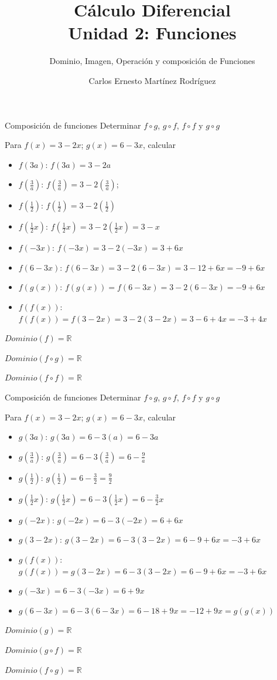 \documentclass[aspectratio=169,10pt]{beamer}
\title{Cálculo Diferencial\\Unidad 2: Funciones}
\subtitle{Dominio, Imagen, Operación y composición de Funciones}
\author{Carlos Ernesto Martínez Rodríguez}
\institute{Tecnológico Nacional de México}
\date{}
\begin{document}

\begin{frame}{Composición de funciones}
Determinar $f\circ g$, $g\circ f$, $f\circ f$ y $g\circ g$

Para $f(x)=3-2x$; $g(x)=6-3x$, calcular
\begin{itemize}
\item $f(3a)$: $f(3a)= 3-2a$
\item $f(\frac{3}{a})$: $f(\frac{3}{a})= 3-2(\frac{3}{a})$; 
\item $f(\frac{1}{2})$: $f(\frac{1}{2})= 3-2(\frac{1}{2})$
\item $f(\frac{1}{2}x)$: $f(\frac{1}{2}x)= 3-2(\frac{1}{2}x)=3-x$
\item $f(-3x)$: $f(-3x)= 3-2(-3x)=3+6x$
\item $f(6-3x)$: $f(6-3x)= 3-2(6-3x)=3-12+6x=-9+6x$
\item  $f(g(x))$: $f(g(x))= f(6-3x)=3-2(6-3x)= -9+6x$
\item  $f(f(x))$: $f(f(x))= f(3-2x)=3-2(3-2x)=3-6+4x=-3+4x$
\end{itemize}

$Dominio(f)=\mathbb{R}$

$Dominio(f\circ g)=\mathbb{R}$

$Dominio(f\circ f)=\mathbb{R}$
\end{frame}

\begin{frame}{Composición de funciones}
Determinar $f\circ g$, $g\circ f$, $f\circ f$ y $g\circ g$

Para $f(x)=3-2x$; $g(x)=6-3x$, calcular
\begin{itemize}
\item $g(3a)$: $g(3a)= 6-3(a)=6-3a$
\item $g(\frac{3}{a})$: $g(\frac{3}{a})= 6-3(\frac{3}{a})=6-\frac{9}{a}$
\item $g(\frac{1}{2})$: $g(\frac{1}{2})= 6-\frac{3}{2}=\frac{9}{2}$
\item $g(\frac{1}{2}x)$: $g(\frac{1}{2}x)=6-3(\frac{1}{2}x)=6-\frac{3}{2}x$
\item $g(-2x)$: $g(-2x)= 6-3(-2x)=6+6x$
\item $g(3-2x)$: $g(3-2x)= 6-3(3-2x)=6-9+6x=-3+6x$
\item  $g(f(x))$: $g(f(x))= g(3-2x)=6-3(3-2x)=6-9+6x=-3+6x$
\item $g(-3x)=6-3(-3x)=6+9x$
\item $g(6-3x)=6-3(6-3x)=6-18+9x=-12+9x=g(g(x))$
\end{itemize}
$Dominio(g)=\mathbb{R}$

$Dominio(g\circ f)=\mathbb{R}$

$Dominio(f\circ g)=\mathbb{R}$



\end{frame}
\end{document}
